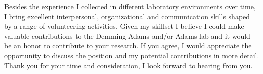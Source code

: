 \documentclass[11pt,a4paper,sans]{moderncv}
\begin{document}
\begin{spacing}{1.2}
Besides the experience I collected in different laboratory environments over time, I bring excellent interpersonal, organizational and communication skills shaped by a range of volunteering activities. Given my skillset I believe I could make valuable contributions to the Demming-Adams and/or Adams lab and it would be an honor to contribute to your research. If you agree, I would appreciate the opportunity to discuss the position and my potential contributions in more detail. Thank you for your time and consideration, I look forward to hearing from you.


 

\end{spacing}
\makeletterclosing
\end{document}

